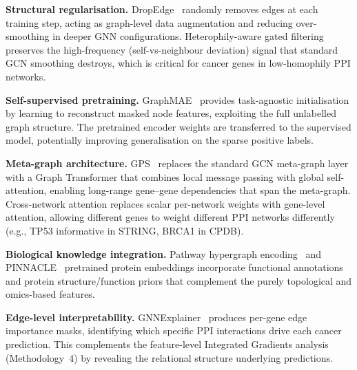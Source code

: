 \textbf{Structural regularisation.} DropEdge~\cite{dropedge2020} randomly removes edges
at each training step, acting as graph-level data augmentation and reducing over-smoothing
in deeper GNN configurations. Heterophily-aware gated filtering preserves the
high-frequency (self-vs-neighbour deviation) signal that standard GCN smoothing destroys,
which is critical for cancer genes in low-homophily PPI networks.

\textbf{Self-supervised pretraining.} GraphMAE~\cite{graphmae2022} provides task-agnostic
initialisation by learning to reconstruct masked node features, exploiting the full
unlabelled graph structure. The pretrained encoder weights are transferred to the
supervised model, potentially improving generalisation on the sparse positive labels.

\textbf{Meta-graph architecture.} GPS~\cite{gps2022} replaces the standard GCN
meta-graph layer with a Graph Transformer that combines local message passing with global
self-attention, enabling long-range gene--gene dependencies that span the meta-graph.
Cross-network attention replaces scalar per-network weights with gene-level attention,
allowing different genes to weight different PPI networks differently
(e.g., TP53 informative in STRING, BRCA1 in CPDB).

\textbf{Biological knowledge integration.} Pathway hypergraph encoding~\cite{hgnn2019}
and PINNACLE~\cite{pinnacle2024} pretrained protein embeddings incorporate functional
annotations and protein structure/function priors that complement the purely topological
and omics-based features.

\textbf{Edge-level interpretability.} GNNExplainer~\cite{gnnexplainer2019} produces
per-gene edge importance masks, identifying which specific PPI interactions drive each
cancer prediction. This complements the feature-level Integrated Gradients analysis
(Methodology~4) by revealing the relational structure underlying predictions.
